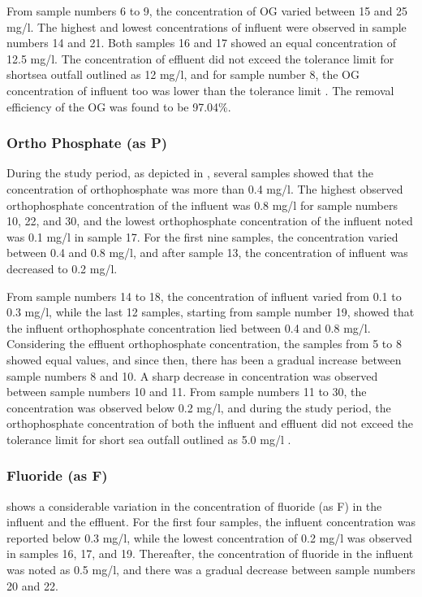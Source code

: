 From sample numbers 6 to 9, the concentration of \ac{OG} varied between 15 and 25 mg/l. The highest and lowest concentrations of influent were observed in sample numbers 14 and 21. Both samples 16 and 17 showed an equal concentration of 12.5 mg/l. The concentration of effluent did not exceed the tolerance limit for shortsea outfall outlined as 12 mg/l, and for sample number 8, the \ac{OG} concentration of influent too was lower than the tolerance limit \cite{CEA2022}. The removal efficiency of the \ac{OG} was found to be 97.04\%.\\




\subsubsection{Ortho Phosphate (as P)}
During the study period, as depicted in , several samples showed that the concentration of orthophosphate was more than 0.4 mg/l. The highest observed orthophosphate concentration of the influent was 0.8 mg/l for sample numbers 10, 22, and 30, and the lowest orthophosphate concentration of the influent noted was 0.1 mg/l in sample 17. For the first nine samples, the concentration varied between 0.4 and 0.8 mg/l, and after sample 13, the concentration of influent was decreased to 0.2 mg/l.

From sample numbers 14 to 18, the concentration of influent varied from 0.1 to 0.3 mg/l, while the last 12 samples, starting from sample number 19, showed that the influent orthophosphate concentration lied between 0.4 and 0.8 mg/l. Considering the effluent orthophosphate concentration, the samples from 5 to 8 showed equal values, and since then, there has been a gradual increase between sample numbers 8 and 10. A sharp decrease in concentration was observed between sample numbers 10 and 11. From sample numbers 11 to 30, the concentration was observed below 0.2 mg/l, and during the study period, the orthophosphate concentration of both the influent and effluent did not exceed the tolerance limit for short sea outfall outlined as 5.0 mg/l \cite{CEA2022}. 



\subsubsection{Fluoride (as F)}
 shows a considerable variation in the concentration of fluoride (as F) in the influent and the effluent. For the first four samples, the influent concentration was reported below 0.3 mg/l, while the lowest concentration of 0.2 mg/l was observed in samples 16, 17, and 19. Thereafter, the concentration of fluoride in the influent was noted as 0.5 mg/l, and there was a gradual decrease between sample numbers 20 and 22.

